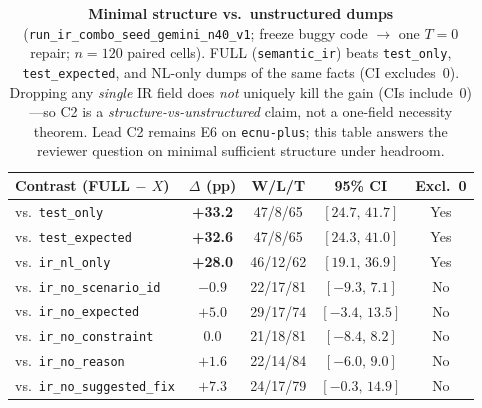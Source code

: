 \begin{table}[t]
  \centering
  \caption{\textbf{Minimal structure vs.\ unstructured dumps}
    (\texttt{run\_ir\_combo\_seed\_gemini\_n40\_v1}; freeze buggy code $\to$
    one $T{=}0$ repair; $n{=}120$ paired cells).
    FULL (\texttt{semantic\_ir}) beats \texttt{test\_only},
    \texttt{test\_expected}, and NL-only dumps of the same facts
    (CI excludes~0).
    Dropping any \emph{single} IR field does \emph{not} uniquely kill the
    gain (CIs include~0)---so C2 is a \emph{structure-vs-unstructured}
    claim, not a one-field necessity theorem.
    Lead C2 remains E6 on \texttt{ecnu-plus}; this table answers the
    reviewer question on minimal sufficient structure under headroom.}
  \label{tab:field-structure}
  \footnotesize
  \renewcommand{\arraystretch}{1.12}
  \begin{tabular}{@{}lcccc@{}}
    \toprule
    Contrast (FULL $-$ $X$) & $\Delta$ (pp) & W/L/T & 95\% CI & Excl.~0 \\
    \midrule
    vs.\ \texttt{test\_only} & \textbf{+33.2} & 47/8/65 & $[24.7,\,41.7]$ & Yes \\
    vs.\ \texttt{test\_expected} & \textbf{+32.6} & 47/8/65 & $[24.3,\,41.0]$ & Yes \\
    vs.\ \texttt{ir\_nl\_only} & \textbf{+28.0} & 46/12/62 & $[19.1,\,36.9]$ & Yes \\
    \midrule
    vs.\ \texttt{ir\_no\_scenario\_id} & $-0.9$ & 22/17/81 & $[-9.3,\,7.1]$ & No \\
    vs.\ \texttt{ir\_no\_expected} & $+5.0$ & 29/17/74 & $[-3.4,\,13.5]$ & No \\
    vs.\ \texttt{ir\_no\_constraint} & $0.0$ & 21/18/81 & $[-8.4,\,8.2]$ & No \\
    vs.\ \texttt{ir\_no\_reason} & $+1.6$ & 22/14/84 & $[-6.0,\,9.0]$ & No \\
    vs.\ \texttt{ir\_no\_suggested\_fix} & $+7.3$ & 24/17/79 & $[-0.3,\,14.9]$ & No \\
    \bottomrule
  \end{tabular}
\end{table}
